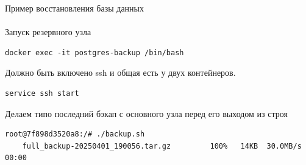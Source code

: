 \documentclass{article}
\begin{document}
Пример восстановления базы данных
\\ \\
Запуск резервного узла
\begin{lstlisting}[caption={kitty}, label={lst:example}]
    docker exec -it postgres-backup /bin/bash
\end{lstlisting}

Должно быть включено ssh и общая есть у двух контейнеров.
\begin{lstlisting}[caption={kitty}, label={lst:example}]
    service ssh start
\end{lstlisting}

Делаем типо последний бэкап с основного узла перед его выходом из строя
\begin{lstlisting}[caption={kitty}, label={lst:example}]
    root@7f898d3520a8:/# ./backup.sh 
    full_backup-20250401_190056.tar.gz         100%   14KB  30.0MB/s   00:00    
\end{lstlisting}
\end{document}
